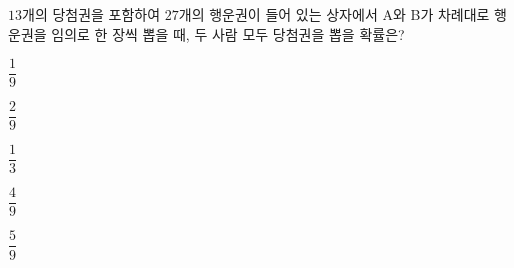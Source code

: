 $13$개의 당첨권을 포함하여 $27$개의 행운권이 들어 있는 상자에서 A와 B가 차례대로 행운권을 임의로 한 장씩 뽑을 때, 두 사람 모두 당첨권을 뽑을 확률은? 
\begin{choices32}{\rule[-3ex]{0pt}{8ex}$\dfrac{1}{9}$}{\rule[-3ex]{0pt}{8ex}$\dfrac{2}{9}$}{\rule[-3ex]{0pt}{8ex}$\dfrac{1}{3}$}{\rule[-3ex]{0pt}{8ex}$\dfrac{4}{9}$}{\rule[-3ex]{0pt}{8ex}$\dfrac{5}{9}$}\end{choices32}
